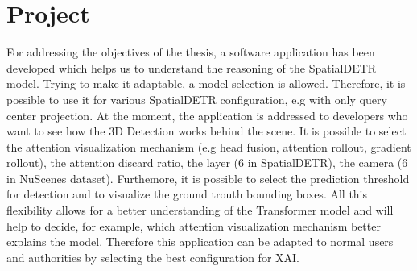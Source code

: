 \chapter{Project}
\label{ch:pj}
For addressing the objectives of the thesis, a software application has been developed which helps us to understand the reasoning of the SpatialDETR model. Trying to make it adaptable, a model selection is allowed. Therefore, it is possible to use it for various SpatialDETR configuration, e.g with only query center projection. 
At the moment, the application is addressed to developers who want to see how the 3D Detection works behind the scene. 
It is possible to select the attention visualization mechanism (e.g head fusion, attention rollout, gradient rollout), the attention discard ratio, the  layer (6 in SpatialDETR), the camera (6 in NuScenes dataset). 
Furthemore, it is possible to select the prediction threshold for detection and to visualize the ground trouth bounding boxes. All this flexibility allows for a better understanding of the Transformer model and will help to decide, for example, which attention visualization mechanism better explains the model. 
Therefore this application can be adapted to normal users and authorities by selecting the best configuration for XAI.
